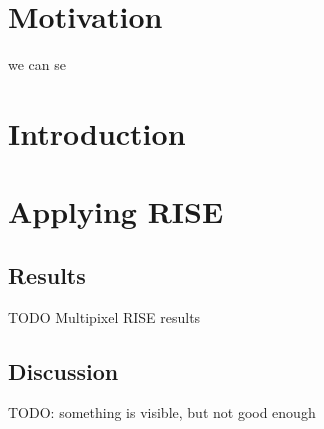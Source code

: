 \section{Motivation}
we can se
\section{Introduction}
\section{Applying RISE}

\subsection{Results}
TODO Multipixel RISE results

\subsection{Discussion}
TODO: something is visible, but not good enough
